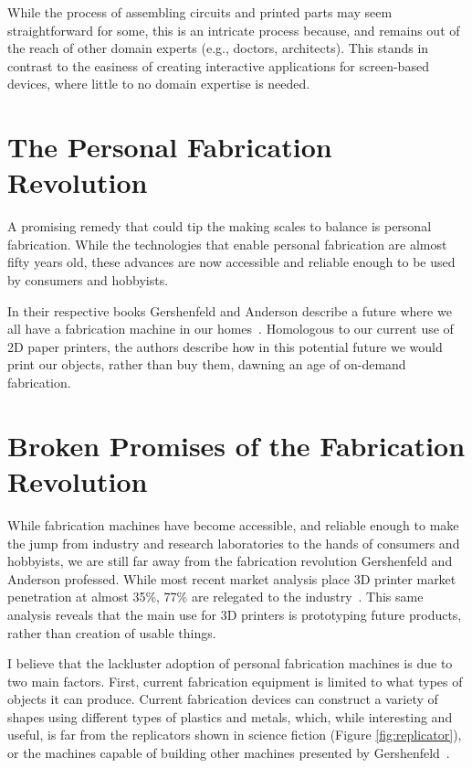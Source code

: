     While the process of assembling circuits and printed parts may seem
    straightforward for some, this is an intricate process because, and remains
    out of the reach of other domain experts (e.g., doctors, architects). This
    stands in contrast to the easiness of creating interactive applications for
    screen-based devices, where little to no domain expertise is needed.
   
  \section{The Personal Fabrication Revolution} \label{sec:fab-revolution}
    A promising remedy that could tip the making scales to balance is
    personal fabrication. While the technologies that enable personal
    fabrication  are almost fifty years old, these advances are
    now accessible and reliable enough to be used by consumers and hobbyists.

    In their respective books Gershenfeld and Anderson describe a future where
    we all have a fabrication machine in our homes~\cite{Gershenfeld:2005,
    Anderson:2012}.  Homologous to our current use of 2D paper printers, the
    authors describe how in this potential future we would print our objects,
    rather than buy them, dawning an age of on-demand fabrication.

  \section{Broken Promises of the Fabrication Revolution} \label{sec:broken-promises}
    While fabrication machines have become accessible, and reliable enough to
    make the jump from industry and research laboratories to the hands of
    consumers and hobbyists, we are still far away from the fabrication
    revolution Gershenfeld and Anderson professed. While most recent market
    analysis place 3D printer market penetration at almost 35\%, 77\% are
    relegated to the industry~\cite{}. This same analysis reveals that the main
    use for 3D printers is prototyping future products, rather than creation of
    usable things. 

    I believe that the lackluster adoption of personal fabrication machines is
    due to two main factors. First, current fabrication equipment is limited to
    what types of objects it can produce. Current fabrication devices can
    construct a variety of shapes using different types of plastics and metals,
    which, while interesting and useful, is far from the replicators shown in
    science fiction (Figure \ref{fig:replicator}), or the machines capable of
    building other machines presented by Gershenfeld~\cite{Gershenfeld:2005}.

